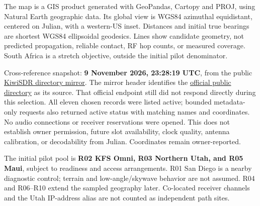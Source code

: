 \documentclass[11pt,a4paper]{article}
\begin{document}
The map is a GIS product generated with GeoPandas, Cartopy and PROJ, using Natural Earth geographic data. Its global view is WGS84 azimuthal equidistant, centered on Julian, with a western-US inset. Distances and initial true bearings are shortest WGS84 ellipsoidal geodesics. Lines show candidate geometry, not predicted propagation, reliable contact, RF hop counts, or measured coverage. South Africa is a stretch objective, outside the initial pilot denominator.

Cross-reference snapshot: \textbf{9 November 2026, 23:28:19 UTC}, from the public \href{http://rx.linkfanel.net/kiwisdr_com.js}{KiwiSDR directory mirror}. The mirror header identifies the \href{http://kiwisdr.com/public/}{official public directory} as its source. That official endpoint still did not respond directly during this selection. All eleven chosen records were listed active; bounded metadata-only  requests also returned active status with matching names and coordinates. No audio connections or receiver reservations were opened. This does not establish owner permission, future slot availability, clock quality, antenna calibration, or decodability from Julian. Coordinates remain owner-reported.

The initial pilot pool is \textbf{R02 KFS Omni, R03 Northern Utah, and R05 Maui}, subject to readiness and access arrangements. R01 San Diego is a nearby diagnostic control; terrain and low-angle/skywave behavior are not assumed. R04 and R06--R10 extend the sampled geography later. Co-located receiver channels and the Utah IP-address alias are not counted as independent path sites.
\end{document}
